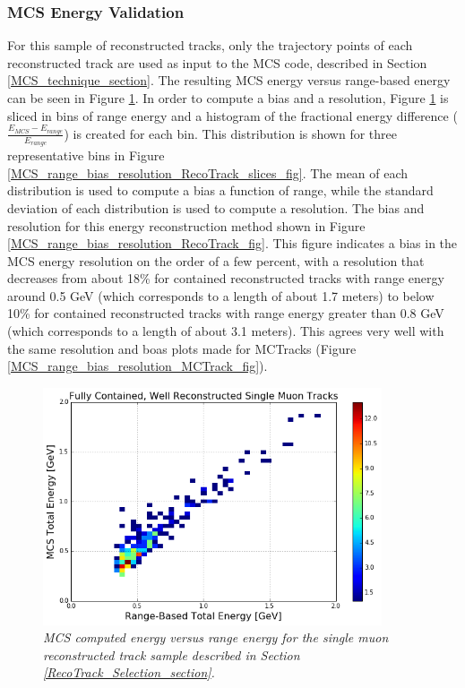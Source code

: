 \subsubsection{MCS Energy Validation}\label{MCS_Energy_Validation_RecoTrack_section}
For this sample of reconstructed tracks, only the trajectory points of each reconstructed track are used as input to the MCS code, described in Section \ref{MCS_technique_section}. The resulting MCS energy versus range-based energy can be seen in Figure \ref{MCS_range_energy_RecoTrack_fig}. In order to compute a bias and a resolution, Figure \ref{MCS_range_energy_RecoTrack_fig} is sliced in bins of range energy and a histogram of the fractional energy difference ($\frac{E_{MCS} - E_{range}}{E_{range}}$) is created for each bin. This distribution is shown for three representative bins in Figure \ref{MCS_range_bias_resolution_RecoTrack_slices_fig}. The mean of each distribution is used to compute a bias a function of range, while the standard deviation of each distribution is used to compute a resolution. The bias and resolution for this energy reconstruction method shown in Figure \ref{MCS_range_bias_resolution_RecoTrack_fig}. This figure indicates a bias in the MCS energy resolution on the order of a few percent, with a resolution that decreases from about 18\% for contained reconstructed tracks with range energy around 0.5 GeV (which corresponds to a length of about 1.7 meters) to below 10\% for contained reconstructed tracks with range energy greater than 0.8 GeV (which corresponds to a length of about 3.1 meters). This agrees very well with the same resolution and boas plots made for {\sc MCTracks} (Figure \ref{MCS_range_bias_resolution_MCTrack_fig}).


\begin{figure}[h!]
\begin{center}
\includegraphics[width=100mm]{Figures/MCS_range_comparison_RecoTracks.png}
\end{center}
\caption{\textit{MCS computed energy versus range energy for the single muon reconstructed track sample described in Section \ref{RecoTrack_Selection_section}.}}
\label{MCS_range_energy_RecoTrack_fig}
\end{figure}

